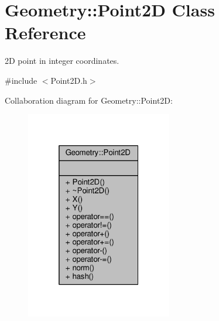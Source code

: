 \hypertarget{classGeometry_1_1Point2D}{}\section{Geometry\+:\+:Point2D Class Reference}
\label{classGeometry_1_1Point2D}


2D point in integer coordinates.  




{\ttfamily \#include $<$Point2\+D.\+h$>$}



Collaboration diagram for Geometry\+:\+:Point2D\+:\nopagebreak
\begin{figure}[H]
\begin{center}
\leavevmode
\includegraphics[width=181pt]{classGeometry_1_1Point2D__coll__graph}
\end{center}
\end{figure}
